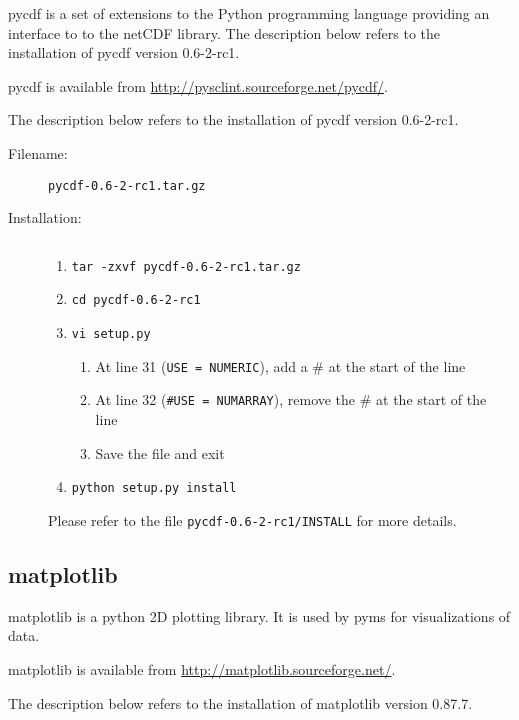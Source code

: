 pycdf is a set of extensions to the Python programming language
providing an interface to to the netCDF library. The description
below refers to the installation of pycdf version 0.6-2-rc1.

pycdf is available from \url{http://pysclint.sourceforge.net/pycdf/}.

The description below refers to the installation of pycdf version
0.6-2-rc1.

\begin{description}
\item [Filename:] {\tt pycdf-0.6-2-rc1.tar.gz}
\item [Installation:] $ $
  \begin{enumerate}
  \item {\tt tar -zxvf pycdf-0.6-2-rc1.tar.gz}
  \item {\tt cd pycdf-0.6-2-rc1}
  \item {\tt vi setup.py}
    \begin{enumerate}
    \item At line 31 ({\tt USE = NUMERIC}), add a \# at the start of the line
    \item At line 32 ({\tt \#USE = NUMARRAY}), remove the \# at the start
    of the line
    \item Save the file and exit
    \end{enumerate}
  \item {\tt python setup.py install}
  \end{enumerate}
Please refer to the file {\tt pycdf-0.6-2-rc1/INSTALL} for more details.
\end{description}

\subsection{matplotlib}

matplotlib is a python 2D plotting library.  It is used by pyms for 
visualizations of data.

matplotlib is available from \url{http://matplotlib.sourceforge.net/}.

The description below refers to the installation of matplotlib version
0.87.7.

